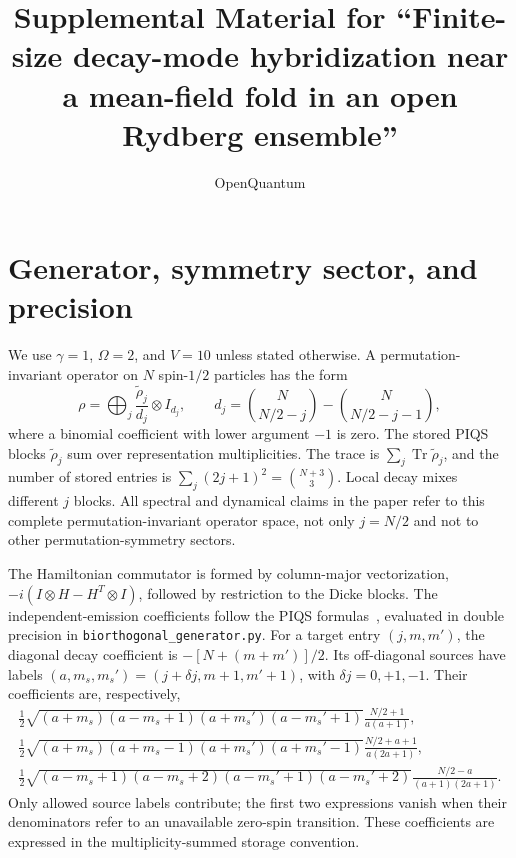 \documentclass[aps,pra,10pt,onecolumn,superscriptaddress,amsmath,amssymb]{revtex4-2}
\newcommand{\Tr}{\operatorname{Tr}}
\begin{document}
\title{Supplemental Material for ``Finite-size decay-mode hybridization near a mean-field fold in an open Rydberg ensemble''}
\author{OpenQuantum}
\noaffiliation
\maketitle

\section{Generator, symmetry sector, and precision}
We use $\gamma=1$, $\Omega=2$, and $V=10$ unless stated otherwise. A permutation-invariant operator on $N$ spin-$1/2$ particles has the form
\begin{equation}
 \rho=\bigoplus_j\frac{\widetilde\rho_j}{d_j}\otimes I_{d_j},\qquad
 d_j=\binom{N}{N/2-j}-\binom{N}{N/2-j-1},
 \label{eq:block}
\end{equation}
where a binomial coefficient with lower argument $-1$ is zero. The stored PIQS blocks $\widetilde\rho_j$ sum over representation multiplicities. The trace is $\sum_j\Tr\widetilde\rho_j$, and the number of stored entries is $\sum_j(2j+1)^2=\binom{N+3}{3}$. Local decay mixes different $j$ blocks. All spectral and dynamical claims in the paper refer to this complete permutation-invariant operator space, not only $j=N/2$ and not to other permutation-symmetry sectors.

The Hamiltonian commutator is formed by column-major vectorization, $-i(I\otimes H-H^T\otimes I)$, followed by restriction to the Dicke blocks. The independent-emission coefficients follow the PIQS formulas~\cite{Shammah2018}, evaluated in double precision in \texttt{biorthogonal\_generator.py}. For a target entry $(j,m,m')$, the diagonal decay coefficient is $-[N+(m+m')]/2$. Its off-diagonal sources have labels $(a,m_s,m_s')=(j+\delta j,m+1,m'+1)$, with $\delta j=0,+1,-1$. Their coefficients are, respectively,
\begin{align}
 \frac12\sqrt{(a+m_s)(a-m_s+1)(a+m_s')(a-m_s'+1)}
       \frac{N/2+1}{a(a+1)},\nonumber\\
 \frac12\sqrt{(a+m_s)(a+m_s-1)(a+m_s')(a+m_s'-1)}
       \frac{N/2+a+1}{a(2a+1)},\nonumber\\
 \frac12\sqrt{(a-m_s+1)(a-m_s+2)(a-m_s'+1)(a-m_s'+2)}
       \frac{N/2-a}{(a+1)(2a+1)}.
 \label{eq:emission}
\end{align}
Only allowed source labels contribute; the first two expressions vanish when their denominators refer to an unavailable zero-spin transition. These coefficients are expressed in the multiplicity-summed storage convention.
\end{document}
